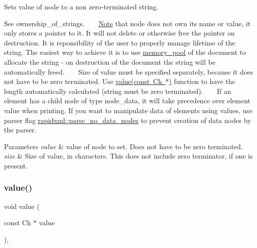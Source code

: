 Sets value of node to a non zero-\/terminated string. 

See ownership\+\_\+of\+\_\+strings. ~\newline
~\newline
 \mbox{\hyperlink{classNote}{Note}} that node does not own its name or value, it only stores a pointer to it. It will not delete or otherwise free the pointer on destruction. It is reponsibility of the user to properly manage lifetime of the string. The easiest way to achieve it is to use \mbox{\hyperlink{classrapidxml_1_1memory__pool}{memory\+\_\+pool}} of the document to allocate the string -\/ on destruction of the document the string will be automatically freed. ~\newline
~\newline
 Size of value must be specified separately, because it does not have to be zero terminated. Use \mbox{\hyperlink{classrapidxml_1_1xml__base_a18c7469acdca771de9b4f3054053029c}{value(const Ch $\ast$)}} function to have the length automatically calculated (string must be zero terminated). ~\newline
~\newline
 If an element has a child node of type node\+\_\+data, it will take precedence over element value when printing. If you want to manipulate data of elements using values, use parser flag \mbox{\hyperlink{namespacerapidxml_a87e8bbab53702cf3b438bd553c10b6b9}{rapidxml\+::parse\+\_\+no\+\_\+data\+\_\+nodes}} to prevent creation of data nodes by the parser. 
\begin{DoxyParams}{Parameters}
{\em value} & value of node to set. Does not have to be zero terminated. \\
\hline
{\em size} & Size of value, in characters. This does not include zero terminator, if one is present. \\
\hline
\end{DoxyParams}
\mbox{\label{classrapidxml_1_1xml__base_a18c7469acdca771de9b4f3054053029c}} 
\subsubsection{\texorpdfstring{value()}{value()}\hspace{0.1cm}{\footnotesize\ttfamily [3/3]}}
{\footnotesize\ttfamily void value (\begin{DoxyParamCaption}\item[{const Ch $\ast$}]{value }\end{DoxyParamCaption})\hspace{0.3cm}{\ttfamily [inline]}, {\ttfamily [inherited]}}



